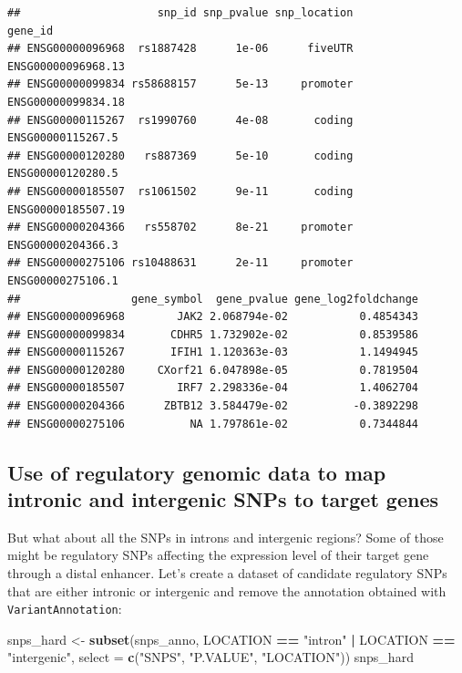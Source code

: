 \documentclass[9pt,a4paper,]{extarticle}
\newenvironment{Shaded}{\begin{snugshade}}{\end{snugshade}}
\newcommand{\KeywordTok}[1]{\textcolor[rgb]{0.13,0.29,0.53}{\textbf{#1}}}
\newcommand{\DataTypeTok}[1]{\textcolor[rgb]{0.13,0.29,0.53}{#1}}
\newcommand{\StringTok}[1]{\textcolor[rgb]{0.31,0.60,0.02}{#1}}
\newcommand{\OperatorTok}[1]{\textcolor[rgb]{0.81,0.36,0.00}{\textbf{#1}}}
\newcommand{\NormalTok}[1]{#1}
\begin{document}
\begin{verbatim}
##                     snp_id snp_pvalue snp_location            gene_id
## ENSG00000096968  rs1887428      1e-06      fiveUTR ENSG00000096968.13
## ENSG00000099834 rs58688157      5e-13     promoter ENSG00000099834.18
## ENSG00000115267  rs1990760      4e-08       coding  ENSG00000115267.5
## ENSG00000120280   rs887369      5e-10       coding  ENSG00000120280.5
## ENSG00000185507  rs1061502      9e-11       coding ENSG00000185507.19
## ENSG00000204366   rs558702      8e-21     promoter  ENSG00000204366.3
## ENSG00000275106 rs10488631      2e-11     promoter  ENSG00000275106.1
##                 gene_symbol  gene_pvalue gene_log2foldchange
## ENSG00000096968        JAK2 2.068794e-02           0.4854343
## ENSG00000099834       CDHR5 1.732902e-02           0.8539586
## ENSG00000115267       IFIH1 1.120363e-03           1.1494945
## ENSG00000120280     CXorf21 6.047898e-05           0.7819504
## ENSG00000185507        IRF7 2.298336e-04           1.4062704
## ENSG00000204366      ZBTB12 3.584479e-02          -0.3892298
## ENSG00000275106          NA 1.797861e-02           0.7344844
\end{verbatim}

\subsection{Use of regulatory genomic data to map intronic and intergenic SNPs to target genes}\label{use-of-regulatory-genomic-data-to-map-intronic-and-intergenic-snps-to-target-genes}

But what about all the SNPs in introns and intergenic regions?
Some of those might be regulatory SNPs affecting the expression level of their target gene through a distal enhancer.
Let's create a dataset of candidate regulatory SNPs that are either intronic or intergenic and remove the annotation obtained with \texttt{VariantAnnotation}:

\begin{Shaded}
\begin{Highlighting}[]
\NormalTok{snps_hard <-}\StringTok{ }\KeywordTok{subset}\NormalTok{(snps_anno, LOCATION }\OperatorTok{==}\StringTok{ "intron"} \OperatorTok{|}\StringTok{ }\NormalTok{LOCATION }\OperatorTok{==}\StringTok{ "intergenic"}\NormalTok{, }\DataTypeTok{select =} \KeywordTok{c}\NormalTok{(}\StringTok{"SNPS"}\NormalTok{, }\StringTok{"P.VALUE"}\NormalTok{, }\StringTok{"LOCATION"}\NormalTok{))}
\NormalTok{snps_hard}
\end{Highlighting}
\end{Shaded}
\end{document}
